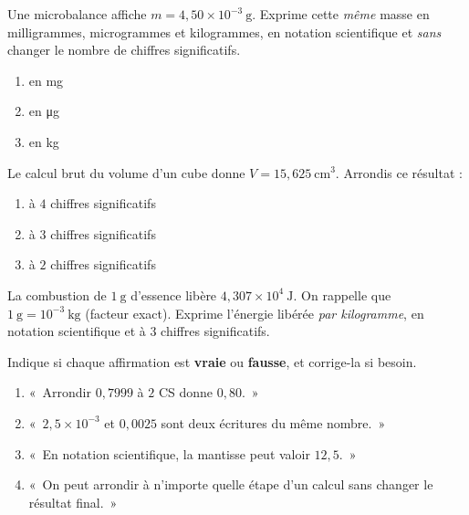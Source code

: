 \documentclass[11pt,a4paper]{article}
\begin{document}
\begin{exo}
Une microbalance affiche $m = 4,50\times10^{-3}\ \si{\gram}$. Exprime cette \emph{même} masse en
milligrammes, microgrammes et kilogrammes, en notation scientifique et \emph{sans} changer le nombre de
chiffres significatifs.
\begin{enumerate}[label=\alph*)]
  \item en \si{\milli\gram}
  \item en \si{\micro\gram}
  \item en \si{\kilo\gram}
\end{enumerate}
\end{exo}

\begin{exo}
Le calcul brut du volume d'un cube donne $V = 15,625\ \si{\centi\metre\cubed}$. Arrondis ce résultat :
\begin{enumerate}[label=\alph*)]
  \item à $4$ chiffres significatifs
  \item à $3$ chiffres significatifs
  \item à $2$ chiffres significatifs
\end{enumerate}
\end{exo}

\begin{exo}
La combustion de $\qty{1}{\gram}$ d'essence libère $4,307\times10^{4}\ \si{\joule}$. On rappelle que
$\qty{1}{\gram}=10^{-3}\ \si{\kilo\gram}$ (facteur exact). Exprime l'énergie libérée \emph{par
kilogramme}, en notation scientifique et à $3$ chiffres significatifs.
\end{exo}

\begin{exo}
Indique si chaque affirmation est \textbf{vraie} ou \textbf{fausse}, et corrige-la si besoin.
\begin{enumerate}[label=\alph*)]
  \item «~Arrondir $0,7999$ à $2$ CS donne $0,80$.~»
  \item «~$2,5\times10^{-3}$ et $0,0025$ sont deux écritures du même nombre.~»
  \item «~En notation scientifique, la mantisse peut valoir $12,5$.~»
  \item «~On peut arrondir à n'importe quelle étape d'un calcul sans changer le résultat final.~»
\end{enumerate}
\end{exo}
\end{document}
